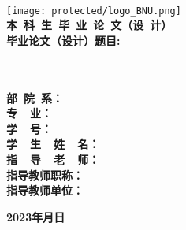 	

\begin{titlepage}
	\begin{center}
	\vspace*{-3em}\hrulefill
	\\	\vspace*{3em}
	{\texttt{[image: protected/logo\_BNU.png]}}
	\\[1em]
	{\textbf{\songti 本\ 科\ 生\ 毕\ 业\ 论\ 文（设\ 计）}}
	\\[6em]
	\textbf{\heiti 毕业论文（设计）题目:\quad\ \ \qquad\qquad\qquad\qquad\qquad\qquad\qquad\qquad}
	\\[0.5em]
	\textbf{\songti\underline{\makebox[28em][c]{\titlethesisCHNi}}}
	\\[0.5em]
	\textbf{\songti\underline{\makebox[28em][c]{\titlethesisCHNii}}}
	\\[4.5em]
	\end{center}
	\textbf{\songti \makebox[59pt][l]{}部\quad\ 院\quad\ 系：\quad}
	\\[0.7em]
	\textbf{\songti \makebox[59pt][l]{}专\qquad\quad\ \ 业：\quad}
	\\[0.7em]
	\textbf{\songti \makebox[59pt][l]{}学\qquad\quad\ \ 号：\quad}
	\\[0.7em]
	\textbf{\songti \makebox[59pt][l]{}学\ \ 生\ \ 姓\ \ 名：\quad}
	\\[0.7em]
	\textbf{\songti \makebox[59pt][l]{}指\ \ 导\ \ 老\ \ 师：\quad}
	\\[0.7em]
	\textbf{\songti \makebox[59pt][l]{}指导教师职称：\quad}
	\\[0.7em]
	\textbf{\songti \makebox[59pt][l]{}指导教师单位：\quad}
	\\[3em]
	\begin{center}
	\textbf{\qquad\qquad\qquad 2023年\quad 月\quad 日}

	\vfill
	
	\end{center}
\end{titlepage}